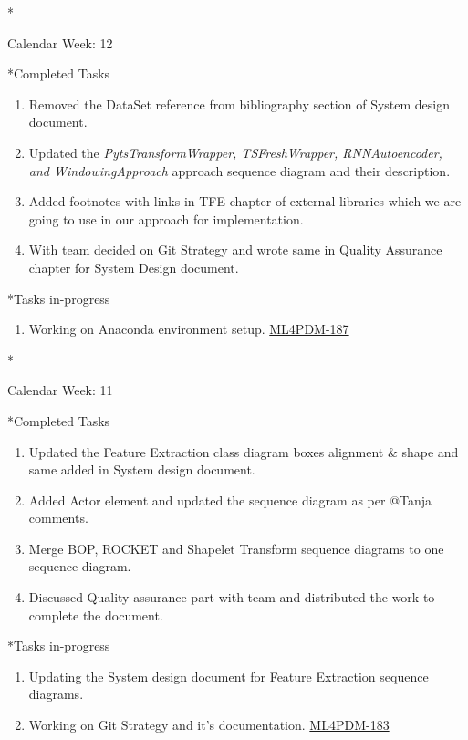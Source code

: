 \documentclass[11pt,a4paper]{article}
\begin{document}
\newpage
\begin{section}*{Calendar Week: 12 \hfill \date{26 March, 2021}}
 \begin{subsection}*{Completed Tasks}
     \begin{enumerate}
         \item Removed the DataSet reference from bibliography section of System design document.
         \item Updated the \textit{PytsTransformWrapper, TSFreshWrapper, RNNAutoencoder, and WindowingApproach} approach sequence diagram and their description.
         \item Added footnotes with links in TFE chapter of external libraries which we are going to use in our approach for implementation.
         \item With team decided on Git Strategy and wrote same in Quality Assurance chapter for System Design document.
     \end{enumerate}
 \end{subsection}

 \begin{subsection}*{Tasks in-progress}
     \begin{enumerate}
         \item Working on Anaconda environment setup. \href{https://ml4pdm.atlassian.net/browse/ML4PDM-187}{ML4PDM-187}
     \end{enumerate}
 \end{subsection}
\end{section}

\newpage
\begin{section}*{Calendar Week: 11 \hfill \date{19 March, 2021}}
 \begin{subsection}*{Completed Tasks}
     \begin{enumerate}
         \item Updated the Feature Extraction class diagram boxes alignment \& shape and same added in System design document.
         \item Added Actor element and updated the sequence diagram as per @Tanja comments.
         \item Merge BOP, ROCKET and Shapelet Transform sequence diagrams to one sequence diagram.
         \item Discussed Quality assurance part with team and distributed the work to complete the document.
     \end{enumerate}
 \end{subsection}

 \begin{subsection}*{Tasks in-progress}
     \begin{enumerate}
         \item Updating the System design document for Feature Extraction sequence diagrams.
         \item Working on Git Strategy and it's documentation. \href{https://ml4pdm.atlassian.net/browse/ML4PDM-183}{ML4PDM-183}
     \end{enumerate}
 \end{subsection}
\end{section}
\end{document}
